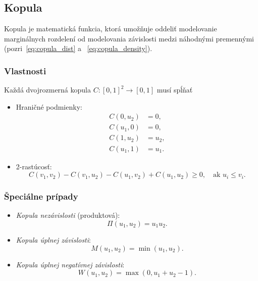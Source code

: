 \subsection{Kopula}
\label{subsec:copulas}

Kopula je matematická funkcia, ktorá umožňuje oddeliť modelovanie marginálnych rozdelení od modelovania závislosti medzi náhodnými premennými (pozri~\ref{eq:copula_dist} a ~\ref{eq:copula_density}).

\subsubsection{Vlastnosti}

Každá dvojrozmerná kopula $C: [0,1]^2 \to [0,1]$ musí spĺňať

\begin{itemize}
  \item Hraničné podmienky:
    \begin{align*}
        C(0, u_2) &= 0, \\
        C(u_1, 0) &= 0, \\
        C(1, u_2) &= u_2, \\
        C(u_1, 1) &= u_1.
    \end{align*}
  \item 2-rastúcosť:
  \begin{equation}
    C(v_1, v_2) - C(v_1, u_2) - C(u_1, v_2) + C(u_1, u_2) \geq 0, \quad \text{ak } u_i \leq v_i.
  \end{equation}
\end{itemize}

\subsubsection{Špeciálne prípady}

\begin{itemize}
  \item \textit{Kopula nezávislosti} (produktová):
  \begin{equation}
  \Pi(u_1, u_2) = u_1 u_2.
  \end{equation}
  \item \textit{Kopula úplnej závislosti}:
  \begin{equation}
  M(u_1,u_2) = \min(u_1, u_2).
  \end{equation}
  \item \textit{Kopula úplnej negatívnej závislosti}:
  \begin{equation}
  W(u_1, u_2) = \max(0, u_1 + u_2 - 1).
  \end{equation}
\end{itemize}

